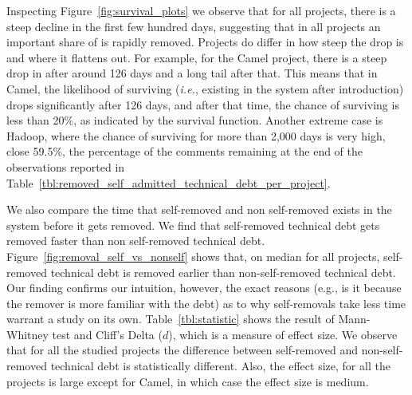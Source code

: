 Inspecting Figure~\ref{fig:survival_plots} we observe that for all projects, there is a steep decline in the first few hundred days, suggesting that in all projects an important share of \SATD is rapidly removed. Projects do differ in how steep the drop is and where it flattens out. For example, for the Camel project, there is a steep drop in \SATD after around 126 days and a long tail after that. This means that in Camel, the likelihood of \SATD surviving (\emph{i.e.}, existing in the system after introduction) drops significantly after 126 days, and after that time, the chance of surviving is less than 20\%, as indicated by the survival function. Another extreme case is Hadoop, where the chance of \SATD surviving for more than 2,000 days is very high, close 59.5\%, the percentage
of the \SATD comments remaining at the end of the observations reported in Table~\ref{tbl:removed_self_admitted_technical_debt_per_project}. 

We also compare the time that self-removed and non self-removed \SATD exists in the system before it gets removed. We find that self-removed technical debt gets removed faster than non self-removed technical debt. Figure~\ref{fig:removal_self_vs_nonself} shows that, on median for all projects, self-removed technical debt is removed earlier than non-self-removed technical debt. Our finding confirms our intuition, however, the exact reasons (e.g., is it because the remover is more familiar with the debt) as to why self-removals take less time warrant a study on its own. Table~\ref{tbl:statistic} shows the result of  Mann-Whitney test and Cliff's Delta ($d$), which is a measure of effect size. We observe that for all the studied projects the difference between self-removed and non-self-removed technical debt is statistically different. Also, the effect size, for all the projects is large except for Camel, in which case the effect size is medium.






